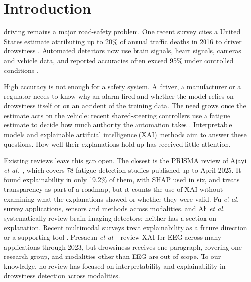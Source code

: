 \section{Introduction}
 driving remains a major road-safety problem. One recent survey cites a United States estimate attributing up to 20\% of annual traffic deaths in 2016 to driver drowsiness \cite{fu2024survey}. Automated detectors now use brain signals, heart signals, cameras and vehicle data, and reported accuracies often exceed 95\% under controlled conditions \cite{ajayi2025multimodal}.

High accuracy is not enough for a safety system. A driver, a manufacturer or a regulator needs to know why an alarm fired and whether the model relies on drowsiness itself or on an accident of the training data. The need grows once the estimate acts on the vehicle: recent shared-steering controllers use a fatigue estimate to decide how much authority the automation takes \cite{hu2026human,yan2026toward}. Interpretable models and explainable artificial intelligence (XAI) methods aim to answer these questions. How well their explanations hold up has received little attention.

Existing reviews leave this gap open. The closest is the PRISMA review of Ajayi \textit{et al.}~\cite{ajayi2025multimodal}, which covers 78 fatigue-detection studies published up to April 2025. It found explainability in only 19.2\% of them, with SHAP used in six, and treats transparency as part of a roadmap, but it counts the use of XAI without examining what the explanations showed or whether they were valid. Fu \textit{et al.}~\cite{fu2024survey} survey applications, sensors and methods across modalities, and Ali \textit{et al.}~\cite{ali2026intelligent} systematically review brain-imaging detectors; neither has a section on explanation. Recent multimodal surveys treat explainability as a future direction or a supporting tool \cite{multimodal2026review,dms2026survey}. Presacan \textit{et al.}~\cite{xaieeg2026review} review XAI for EEG across many applications through 2023, but drowsiness receives one paragraph, covering one research group, and modalities other than EEG are out of scope. To our knowledge, no review has focused on interpretability and explainability in drowsiness detection across modalities. 

